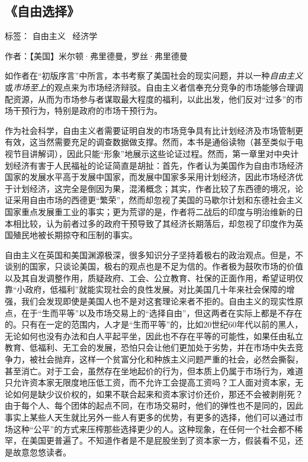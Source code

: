 \subsection{《自由选择》}

标签： 自由主义 \ 经济学

作者：【美国】米尔顿·弗里德曼，罗丝·弗里德曼

如作者在“初版序言”中所言，本书考察了美国社会的现实问题，并以一种\emph{自由主义}或\emph{市场至上}的观点来为市场经济辩驳。自由主义者信奉充分竞争的市场能够合理调配资源，从而为市场参与者谋取最大程度的福利，以此出发，他们反对“过多”的市场干预行为，特别是政府的市场干预行为。

作为社会科学，自由主义者需要证明自发的市场竞争具有比计划经济及市场管制更有效，这当然需要充足的调查数据做支撑。然而，本书是通俗读物（甚至类似于电视节目讲解词），因此只能“形象”地展示这些论证过程。然而，第一章里对中央计划经济有害于人民福祉的论证简直是胡扯：首先，作者认为美国作为自由市场经济国家的发展水平高于发展中国家，而发展中国家多采用计划经济，因此市场经济优于计划经济，这完全是倒因为果，混淆概念；其实，作者比较了东西德的境况，论证采用自由市场的西德更“繁荣”，然而却忽视了美国的马歇尔计划和东德社会主义国家重点发展重工业的事实；更为荒谬的是，作者将二战后的印度与明治维新的日本相比较，认为前者过多的政府干预导致了其经济长期落后，却忽视了印度作为英国殖民地被长期掠夺和压制的事实。

自由主义在英国和美国渊源极深，很多知识分子坚持着极右的政治观点。但是，不谈别的国家，只谈论美国，极右的观点也是不足为信的。作者极为鼓吹市场的价值以及其自发调整作用，质疑政府、工会、公立教育、社保的正面作用，希望证明仅靠“小政府，低福利”就能实现社会的良性发展。对比美国几十年来社会保障的增强，我们会发现即使是美国人也不是对这套理论来者不拒的。自由主义的现实性原点，在于“生而平等”以及市场交易上的“选择自由”，但这两者在实际上都是不存在的。只有在一定的范围内，人才是“生而平等”的，比如20世纪60年代以前的黑人，无论如何也没有办法和白人平起平坐，因此也不存在平等的可能性，如果任由私立教育、低福利、无工会的发展，恐怕只会让他们更加处于劣势，并在市场中失去竞争力，被社会抛弃，这样一个贫富分化和种族主义问题严重的社会，必然会撕裂，甚至消亡。对于工会，虽然存在坐地起价的行为，但本质上仍属于市场行为，难道只允许资本家无限度地压低工资，而不允许工会提高工资吗？工人面对资本家，无论如何是缺少议价权的，如果不联合起来和资本家讨价还价，那还不会被剥削死？由于每个人、每个团体的起点不同，在市场交易时，他们的弹性也不是同的，因此事实上某些人天生就比另外一些人有更多的优势，有更多的选择，他们可以通过市场这种“公平”的方式来压榨那些选择更少的人。这种现象，在任何一个社会都不稀罕，在美国更普遍了。不知道作者是不是屁股坐到了资本家一方，假装看不见，还是故意忽悠读者。

